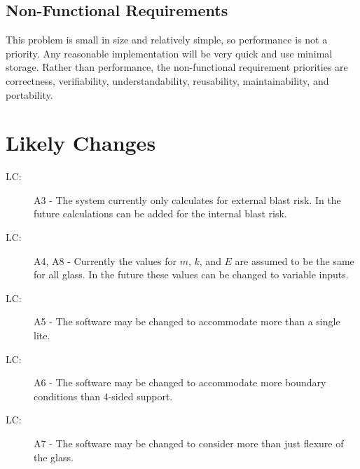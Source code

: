 \documentclass[12pt]{article}
\newcounter{lcnum}
\newcommand{\lcthelcnum}{LC\thelcnum}
\begin{document}
\subsection{Non-Functional Requirements}
\label{Sec:NFRs}
This problem is small in size and relatively simple, so performance is not a priority. Any reasonable implementation will be very quick and use minimal storage. Rather than performance, the non-functional requirement priorities are correctness, verifiability, understandability, reusability, maintainability, and portability.
\section{Likely Changes}
\label{Sec:LCs}
\begin{description}
\item[\lcthelcnum\label{LC:s8.likelychg1}:]A3 - The system currently only calculates for external blast risk. In the future calculations can be added for the internal blast risk.
\end{description}
\begin{description}
\item[\lcthelcnum\label{LC:s8.likelychg2}:]A4, A8 - Currently the values for $m$, $k$, and $E$ are assumed to be the same for all glass. In the future these values can be changed to variable inputs.
\end{description}
\begin{description}
\item[\lcthelcnum\label{LC:s8.likelychg3}:]A5 - The software may be changed to accommodate more than a single lite.
\end{description}
\begin{description}
\item[\lcthelcnum\label{LC:s8.likelychg4}:]A6 - The software may be changed to accommodate more boundary conditions than 4-sided support.
\end{description}
\begin{description}
\item[\lcthelcnum\label{LC:s8.likelychg5}:]A7 - The software may be changed to consider more than just flexure of the glass.
\end{description}
\end{document}
